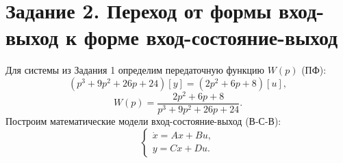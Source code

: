 \section*{Задание 2. Переход от формы вход-выход к форме вход-состояние-выход}

Для системы из Задания 1 определим передаточную функцию $W(p)$ (ПФ):
$$
(p^3+9p^2+26p+24)[y]=(2p^2+6p+8)[u],
$$
\begin{equation}
    \label{eq:pf1}
    W(p)=\frac{2p^2+6p+8}{p^3+9p^2+26p+24}.
\end{equation}
Построим  математические модели вход-состояние-выход (В-С-В):
\begin{equation*}
    \begin{cases}
        \dot x = Ax + Bu,\\
        y = Cx + Du.
    \end{cases}
\end{equation*}

